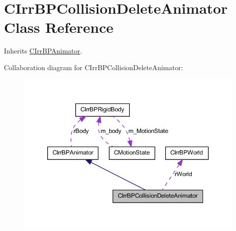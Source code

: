 \hypertarget{class_c_irr_b_p_collision_delete_animator}{
\section{CIrrBPCollisionDeleteAnimator Class Reference}
\label{class_c_irr_b_p_collision_delete_animator}
}


Inherits \hyperlink{class_c_irr_b_p_animator}{CIrrBPAnimator}.



Collaboration diagram for CIrrBPCollisionDeleteAnimator:\nopagebreak
\begin{figure}[H]
\begin{center}
\leavevmode
\includegraphics[width=346pt]{class_c_irr_b_p_collision_delete_animator__coll__graph}
\end{center}
\end{figure}
